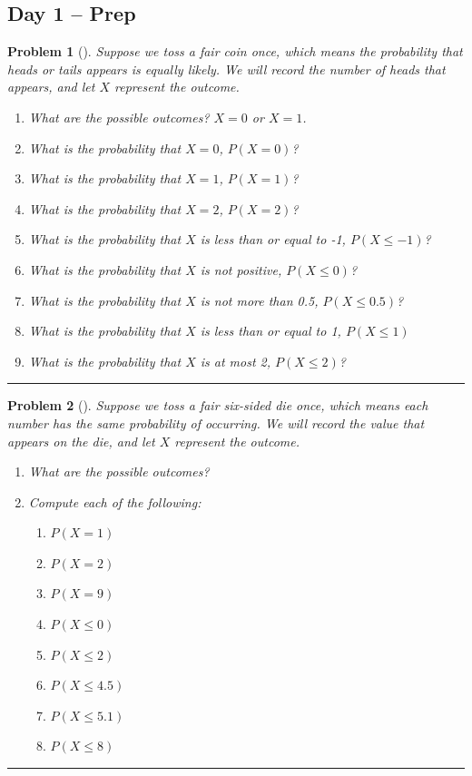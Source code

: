 \documentclass[letterpaper,oneside]{book}%
\theoremstyle{plain}
\theoremstyle{box}
\theoremstyle{problem}
\newtheorem{problemnum}{Problem}[chapter]
\newenvironment{problem}[1][]{\begin{problemnum}[#1]}{\end{problemnum}\nopagebreak\hrule\bigskip}
\begin{document}
\subsection{Day 1 -- Prep}
\begin{problem}
\label{D1_Coin}
Suppose we toss a fair coin once, which means the probability that heads or tails appears is equally likely. 
We will record the number of heads that appears, and let $X$ represent the outcome. 
 \begin{enumerate}
  \item What are the possible outcomes?  $X=0$ or $X=1$. 
  \item What is the probability that $X=0$, $P(X=0)$?   
  \item What is the probability that $X=1$, $P(X=1)$?   
  \item What is the probability that $X=2$, $P(X=2)$?  
  \item What is the probability that $X$ is less than or equal to -1, $P(X\leq -1)$?
  \item What is the probability that $X$ is not positive, $P(X\leq 0)$?
  \item What is the probability that $X$ is not more than 0.5, $P(X\leq 0.5)$?
  \item What is the probability that $X$ is less than or equal to 1, $P(X\leq 1)$
  \item What is the probability that $X$ is at most 2, $P(X\leq 2)$?
 \end{enumerate}
\end{problem}

\begin{problem}
\label{D1_Die}
Suppose we toss a fair six-sided die once, which means each number has the same probability of occurring. 
We will record the value that appears on the die, and let $X$ represent the outcome.
  \begin{enumerate}
  \item What are the possible outcomes?  
  \item Compute each of the following: 
  \begin{enumerate}
    \item $P(X=1)$
    \item $P(X=2)$
    \item $P(X=9)$
    \item $P(X\leq 0)$
    \item $P(X\leq 2)$
    \item $P(X\leq 4.5)$
    \item $P(X\leq 5.1)$
    \item $P(X\leq 8)$
  \end{enumerate}
 \end{enumerate}
\end{problem}
\end{document}
